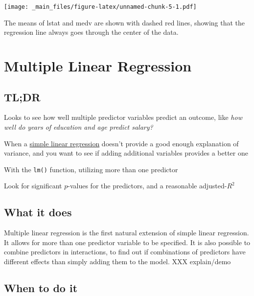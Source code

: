 \documentclass[
]{book}
\providecommand{\tightlist}{%
  \setlength{\itemsep}{0pt}\setlength{\parskip}{0pt}}
\begin{document}
\texttt{[image: \_main\_files/figure-latex/unnamed-chunk-5-1.pdf]}

The means of lstat and medv are shown with dashed red lines, showing that the regression line always goes through the center of the data.

\hypertarget{multiple-linear-regression}{%
\chapter{Multiple Linear Regression}\label{multiple-linear-regression}}

\hypertarget{tldr-1}{%
\section{TL;DR}\label{tldr-1}}

\begin{description}
\tightlist
\item[What it does]
Looks to see how well multiple predictor variables predict an outcome, like \emph{how well do years of education and age predict salary?}
\item[When to do it]
When a \protect\hyperlink{simple-linear-regression}{simple linear regression} doesn't provide a good enough explanation of variance, and you want to see if adding additional variables provides a better one
\item[How to do it]
With the \texttt{lm()} function, utilizing more than one predictor
\item[How to assess it]
Look for significant \(p\)-values for the predictors, and a reasonable adjusted-\(R^2\)
\end{description}

\hypertarget{what-it-does-1}{%
\section{What it does}\label{what-it-does-1}}

Multiple linear regression is the first natural extension of simple linear regression. It allows for more than one predictor variable to be specified. It is also possible to combine predictors in interactions, to find out if combinations of predictors have different effects than simply adding them to the model. XXX explain/demo

\hypertarget{when-to-do-it-1}{%
\section{When to do it}\label{when-to-do-it-1}}
\end{document}
